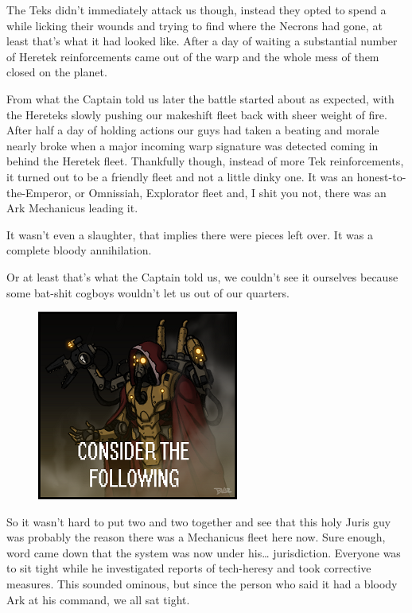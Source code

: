 The Teks didn't immediately attack us though, instead they opted to spend a while licking their wounds and trying to find where the Necrons had gone, at least that's what it had looked like. 
After a day of waiting a substantial number of Heretek reinforcements came out of the warp and the whole mess of them closed on the planet. 


From what the Captain told us later the battle started about as expected, with the Hereteks slowly pushing our makeshift fleet back with sheer weight of fire. 
After half a day of holding actions our guys had taken a beating and morale nearly broke when a major incoming warp signature was detected coming in behind the Heretek fleet. 
Thankfully though, instead of more Tek reinforcements, it turned out to be a friendly fleet and not a little dinky one. 
It was an honest-to-the-Emperor, or Omnissiah, Explorator fleet and, I shit you not, there was an Ark Mechanicus leading it.

It wasn't even a slaughter, that implies there were pieces left over. 
It was a complete bloody annihilation.

Or at least that's what the Captain told us, we couldn't see it ourselves because some bat-shit cogboys wouldn't let us out of our quarters.

\begin{figure}
	\begin{center}
		\includegraphics[width=\figwidth]{pics/11/97.png}
	\end{center}
\end{figure}
So it wasn't hard to put two and two together and see that this holy Juris guy was probably the reason there was a Mechanicus fleet here now. 
Sure enough, word came down that the system was now under his… jurisdiction. 
Everyone was to sit tight while he investigated reports of tech-heresy and took corrective measures. 
This sounded ominous, but since the person who said it had a bloody Ark at his command, we all sat tight.

